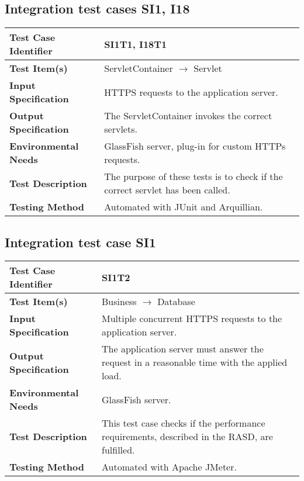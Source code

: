 \vspace{2em}

\subsection {Integration test cases SI1, I18}

\indent

\vspace{1em}

\begin{tabular}{l p{}}
    \hline
    \textbf{Test Case Identifier} & SI1T1, I18T1\\
    \hline
    \textbf{Test Item(s)} & ServletContainer $\rightarrow$ Servlet \\
    \hline
    \textbf{Input Specification} &  HTTPS requests to the application server. \\
    \hline
    \textbf{Output Specification} &  The ServletContainer invokes the correct servlets. \\
    \hline
    \textbf{Environmental Needs} & GlassFish server, plug-in for custom HTTPs requests. \\
    \hline
    \textbf{Test Description} & The purpose of these tests is to check if the correct servlet has been called.  \\
    \hline
    \textbf{Testing Method} & Automated with JUnit and Arquillian. \\
    \hline
\end{tabular}

\vspace{2em}

\subsection {Integration test case SI1}

\indent

\vspace{1em}

\begin{tabular}{l p{}}
    \hline
    \textbf{Test Case Identifier} & SI1T2\\
    \hline
    \textbf{Test Item(s)} & Business $\rightarrow$ Database \\
    \hline
    \textbf{Input Specification} &  Multiple concurrent HTTPS requests to the application server. \\
    \hline
    \textbf{Output Specification} & The application server must answer the request in a reasonable time with the applied load. \\
    \hline
    \textbf{Environmental Needs} & GlassFish server. \\
    \hline
    \textbf{Test Description} & This test case checks if the performance requirements, described in the RASD, are fulfilled.  \\
    \hline
    \textbf{Testing Method} & Automated with Apache JMeter. \\
    \hline
\end{tabular}

